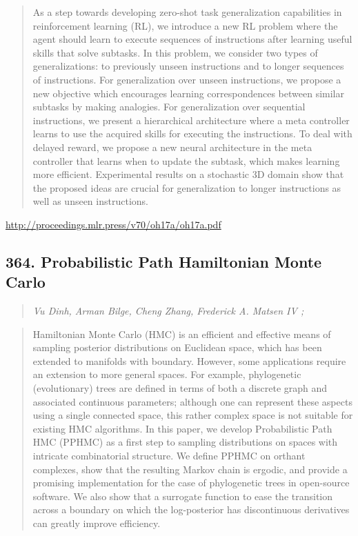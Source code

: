 \documentclass{article}
\begin{document}
\begin{quote}
    As a step towards developing zero-shot task generalization capabilities in reinforcement learning (RL), we introduce a new RL problem where the agent should learn to execute sequences of instructions after learning useful skills that solve subtasks. In this problem, we consider two types of generalizations: to previously unseen instructions and to longer sequences of instructions. For generalization over unseen instructions, we propose a new objective which encourages learning correspondences between similar subtasks by making analogies. For generalization over sequential instructions, we present a hierarchical architecture where a meta controller learns to use the acquired skills for executing the instructions. To deal with delayed reward, we propose a new neural architecture in the meta controller that learns when to update the subtask, which makes learning more efficient. Experimental results on a stochastic 3D domain show that the proposed ideas are crucial for generalization to longer instructions as well as unseen instructions.  \end{quote}

\href{http://proceedings.mlr.press/v70/oh17a/oh17a.pdf}{http://proceedings.mlr.press/v70/oh17a/oh17a.pdf}

\subsection{364. Probabilistic Path Hamiltonian Monte Carlo}

\begin{quote}
\footnotesize{\textit{Vu Dinh, Arman Bilge, Cheng Zhang, Frederick A. Matsen IV ;}}
\end{quote}

\begin{quote}
    Hamiltonian Monte Carlo (HMC) is an efficient and effective means of sampling posterior distributions on Euclidean space, which has been extended to manifolds with boundary. However, some applications require an extension to more general spaces. For example, phylogenetic (evolutionary) trees are defined in terms of both a discrete graph and associated continuous parameters; although one can represent these aspects using a single connected space, this rather complex space is not suitable for existing HMC algorithms. In this paper, we develop Probabilistic Path HMC (PPHMC) as a first step to sampling distributions on spaces with intricate combinatorial structure. We define PPHMC on orthant complexes, show that the resulting Markov chain is ergodic, and provide a promising implementation for the case of phylogenetic trees in open-source software. We also show that a surrogate function to ease the transition across a boundary on which the log-posterior has discontinuous derivatives can greatly improve efficiency.  \end{quote}
\end{document}
